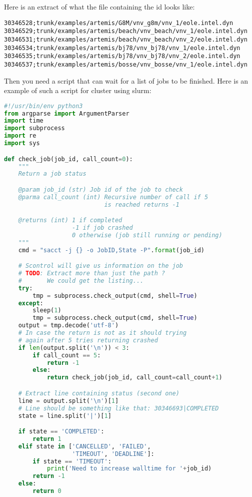 Here is an extract of what the file containing the id looks like:
\begin{verbatim}
30346528;trunk/examples/artemis/G8M/vnv_g8m/vnv_1/eole.intel.dyn
30346529;trunk/examples/artemis/beach/vnv_beach/vnv_1/eole.intel.dyn
30346531;trunk/examples/artemis/beach/vnv_beach/vnv_2/eole.intel.dyn
30346534;trunk/examples/artemis/bj78/vnv_bj78/vnv_1/eole.intel.dyn
30346535;trunk/examples/artemis/bj78/vnv_bj78/vnv_2/eole.intel.dyn
30346537;trunk/examples/artemis/bosse/vnv_bosse/vnv_1/eole.intel.dyn
\end{verbatim}

Then you need a script that can wait for a list of jobs to be finished.
Here is an example of such a script for cluster using slurm:

\begin{lstlisting}[language=python,basicstyle=\footnotesize,keywordstyle=\color{blue}\footnotesize]
#!/usr/bin/env python3
from argparse import ArgumentParser
import time
import subprocess
import re
import sys

def check_job(job_id, call_count=0):
    """
    Return a job status

    @param job_id (str) Job id of the job to check
    @parma call_count (int) Recursive number of call if 5
                            is reached returns -1

    @returns (int) 1 if completed
                   -1 if job crashed
                   0 otherwise (job still running or pending)
    """
    cmd = "sacct -j {} -o JobID,State -P".format(job_id)

    # Scontrol will give us information on the job
    # TODO: Extract more than just the path ?
    #       We could get the listing...
    try:
        tmp = subprocess.check_output(cmd, shell=True)
    except:
        sleep(1)
        tmp = subprocess.check_output(cmd, shell=True)
    output = tmp.decode('utf-8')
    # In case the return is not as it should trying
    # again after 5 tries returning crashed
    if len(output.split('\n')) < 3:
        if call_count == 5:
            return -1
        else:
            return check_job(job_id, call_count=call_count+1)

    # Extract line containing status (second one)
    line = output.split('\n')[1]
    # Line should be something like that: 30346693|COMPLETED
    state = line.split('|')[1]

    if state == 'COMPLETED':
        return 1
    elif state in ['CANCELLED', 'FAILED',
                   'TIMEOUT', 'DEADLINE']:
        if state == 'TIMEOUT':
            print('Need to increase walltime for '+job_id)
        return -1
    else:
        return 0


\end{lstlisting}
